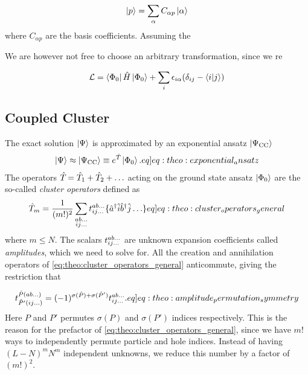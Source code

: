 \begin{align*}
    \ket{p} = \sum_{\alpha} C_{\alpha p}\ket{\alpha}
\end{align*}
where $C_{\alpha p}$ are the basis coefficients. Assuming the 

We are however not free to choose an arbitrary transformation, since we re 

\begin{align}
    \mathcal{L} = \braansatz \ham \ketansatz + \sum_i \epsilon_{i\alpha} (\delta_{ij} - \ip{i}{j})
\end{align}

\subsection{Coupled Cluster}
The exact solution $\ket{\Psi}$ is approximated by an exponential ansatz $\ket{\Psi_{\text{CC}}}$ 
\begin{align}
    \ket{\Psi} \approx \ketCC \equiv \exp{\cluster{}} \ketansatz. \label[eq]{eq:theo:exponential_ansatz}
\end{align}
The operators $\hat{T}_{} = \hat{T}_{1} + \hat{T}_{2} + \ldots$ acting on the ground state ansatz $\ket{\Phi_0}$ are the so-called \textit{cluster operators} defined as
\begin{align}
    \cluster{m} = \frac{1}{(m!)^2} \sum_{\substack{ab\ldots\\ij\ldots}} \amplitude{ab\ldots}{ij\ldots} \set{\crt{a}\ani{i} \crt{b} \ani{j}\ldots} \label[eq]{eq:theo:cluster_operators_general}
\end{align}
where $m \leq N$. The scalars $t^{ab\ldots}_{ij\ldots}$ are unknown expansion coefficients called \textit{amplitudes}, which we need to solve for. All the creation and annihilation operators of \cref{eq:theo:cluster_operators_general} anticommute, giving the restriction that

\begin{align}
    \amplitude{\hat{P}(ab\ldots)}{\hat{P}'(ij\ldots)} = (-1)^{\sigma(\hat{P})+\sigma(\hat{P}')} \amplitude{ab\ldots}{ij\ldots}. \label[eq]{eq:theo:amplitude_permutation_symmetry}
\end{align}
Here $P$ and $P'$ permutes $\sigma(P)$ and $\sigma(P')$ indices respectively. This is the reason for the prefactor of \cref{eq:theo:cluster_operators_general}, since we have $m!$ ways to independently permute particle and hole indices. Instead of having $(L-N)^m N^m$ independent unknowns, we reduce this number by a factor of $(m!)^{2}$. 

